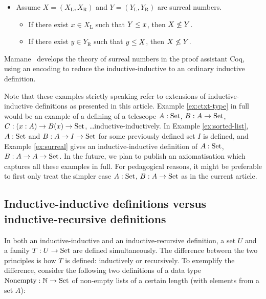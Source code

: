 \documentclass{article}
\begin{document}
\begin{example}
\begin{itemize}
\item Assume $X = (X_\mathrm{L}, X_\mathrm{R})$ and $Y = (Y_\mathrm{L}, Y_\mathrm{R})$ are surreal numbers.
 \begin{itemize}
 \item If there exist $x \in X_\mathrm{L}$ such that $Y \leq x$, then $X \not\leq Y$.
 \item If there exist $y \in Y_\mathrm{R}$ such that $y \leq X$, then $X \not\leq Y$.
 \end{itemize}
\end{itemize}


Mamane~\cite{mamane2004surrealCoq} develops the theory of surreal
numbers in the proof assistant Coq, using an encoding to reduce the
inductive-inductive to an ordinary inductive definition.
\blackqed
\end{example}

Note that these examples strictly speaking refer to extensions of
inductive-inductive definitions as presented in this article. Example
\ref{ex:ctxt-type} in full would be an example of a defining of a
telescope $A : \text{Set}$, $B : A \to \text{Set}$, $C : (x : A) \to B(x) \to
\text{Set}$, \ldots inductive-inductively. In Example \ref{ex:sorted-list},
$A : \text{Set}$ and $B : A \to I \to \text{Set}$ for some previously defined set
$I$ is defined, and Example \ref{ex:surreal} gives an
inductive-inductive definition of $A : \text{Set}$, $B : A \to A \to
\text{Set}$. In the future, we plan to publish an axiomatisation which
captures all these examples in full. For pedagogical reasons, it might
be preferable to first only treat the simpler case $A : \text{Set}$, $B : A
\to \text{Set}$ as in the current article.

\subsection{Inductive-inductive definitions versus inductive-recursive definitions}
\label{sec:indind-vs-IR}


In both an inductive-inductive and an inductive-recursive definition,
a set $U$ and a family $T : U \to \text{Set}$ are defined
simultaneously. The difference between the two principles is how $T$
is defined: inductively or recursively.
To exemplify the difference,
consider the following two definitions of a data type $\text{Nonempty} : \mathbb{N}
\to \text{Set}$ of non-empty lists of a certain length (with elements from a set $A$):
\end{document}
